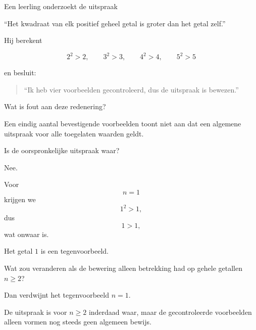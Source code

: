 \documentclass{ximera}
\begin{document}
\begin{oefening}{\oefU \ESS}

Een leerling onderzoekt de uitspraak

\begin{center}
``Het kwadraat van elk positief geheel getal is groter dan het getal
zelf.''
\end{center}

Hij berekent

\[
2^2>2,\qquad
3^2>3,\qquad
4^2>4,\qquad
5^2>5
\]

en besluit:

\begin{quote}
``Ik heb vier voorbeelden gecontroleerd, dus de uitspraak is bewezen.''
\end{quote}

\begin{question}
Wat is fout aan deze redenering?

\begin{oplossing}
Een eindig aantal bevestigende voorbeelden toont niet aan dat een
algemene uitspraak voor alle toegelaten waarden geldt.
\end{oplossing}
\end{question}


\begin{question}
Is de oorspronkelijke uitspraak waar?

\begin{oplossing}
Nee.

Voor
\[
n=1
\]
krijgen we
\[
1^2>1,
\]
dus
\[
1>1,
\]
wat onwaar is.

Het getal $1$ is een tegenvoorbeeld.
\end{oplossing}
\end{question}


\begin{question}
Wat zou veranderen als de bewering alleen betrekking had op gehele
getallen $n\geq2$?

\begin{oplossing}
Dan verdwijnt het tegenvoorbeeld $n=1$.

De uitspraak is voor $n\geq2$ inderdaad waar, maar de gecontroleerde
voorbeelden alleen vormen nog steeds geen algemeen bewijs.
\end{oplossing}
\end{question}

\end{oefening}
\end{document}

